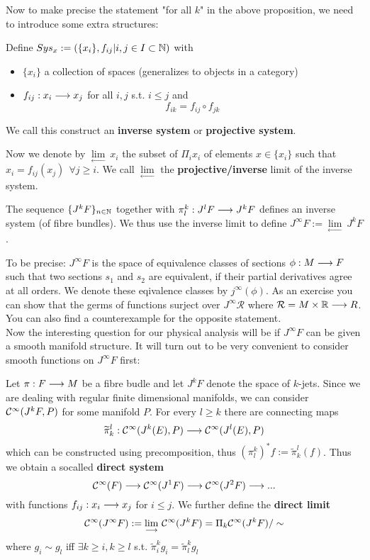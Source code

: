 Now to make precise the statement "for all $k$" in the above proposition, we need to introduce some extra structures:

\begin{definition}
  Define $Sys_x := (\{x_i\}, f_{ij} | i,j \in I \subset \mathbb{N})$ with
  \begin{itemize}
    \item $\{x_i\}$ a collection of spaces (generalizes to objects in a category)
    \item $f_{ij}:x_i \longrightarrow x_j$ for all $i,j$ s.t. $i \leq j$ and
    $$ f_{ik} = f_{ij} \circ f_{jk} $$
  \end{itemize}
  We call this construct an \textbf{inverse system} or \textbf{projective system}.
\end{definition}

Now we denote by $\underset{\longleftarrow}{\lim} \ x_i$ the subset of $\Pi_i x_i$ of elements $x\in \{ x_i\}$ such that $x_i = f_{ij}(x_j) \ \ \forall j \geq i$. We call $\underset{\longleftarrow}{\lim}$ the \textbf{projective/inverse} limit of the inverse system.

\begin{definition}
  The sequence $\{J^k F\}_{n\in\mathbb{N}}$ together with $\pi^k_l: J^l F \longrightarrow J^k F$ defines an inverse system (of fibre bundles). We thus use the inverse limit to define $J^\infty F := \underset{\longleftarrow}{\lim}\ J^k F$.
\end{definition}

To be precise: $J^\infty F$ is the space of equivalence classes of sections $\phi:M \lra F$ such that two sections $s_1$ and $s_2$ are equivalent, if their partial derivatives agree at all orders. We denote these eqivalence classes by $j^\infty(\phi)$. As an exercise you can show that the germs of functions surject over $J^\infty \mathcal{R}$ where $\mathcal{R} = M \times \mathbb{R} \longrightarrow R$. You can also find a counterexample for the opposite statement.\\

Now the interesting question for our physical analysis will be if $J^\infty F$ can be given a smooth manifold structure. It will turn out to be very convenient to consider smooth functions on $J^\infty F$ first:

\begin{definition}
  Let $\pi: F \longrightarrow M$ be a fibre budle and let $J^kF$ denote the space of $k$-jets. Since we are dealing with regular finite dimensional manifolds, we can consider $\mathcal{C}^{\infty}(J^kF, P)$ for some manifold $P$. For every $l\geq k$ there are connecting maps
  $$\widetilde \pi^l_k : \mathcal{C}^{\infty}(J^k(E), P) \longrightarrow \mathcal{C}^{\infty}(J^l(E), P)$$
  which can be constructed using precomposition, thus $(\pi^k_l)^* f := \widetilde \pi^l_k (f)$. Thus we obtain a socalled \textbf{direct system}
  $$ \mathcal{C}^{\infty}(F) \longrightarrow \mathcal{C}^{\infty}(J^1F) \longrightarrow \mathcal{C}^{\infty}(J^2F) \longrightarrow ... $$
  with functions $f_{ij}:x_i \longrightarrow x_j$ for $i\leq j$. We further define the \textbf{direct limit}
  $$\mathcal{C}^{\infty}(J^\infty F) := \underset{\longrightarrow}{\lim}\ \mathcal{C}^{\infty}(J^k F) = \Pi_k \mathcal{C}^{\infty}(J^k F) / \sim$$
  where $g_i \sim g_l$ iff $\exists k \geq i, k \geq l$ s.t. $\widetilde \pi^k_i g_i = \widetilde \pi^k_l g_l$
\end{definition}

